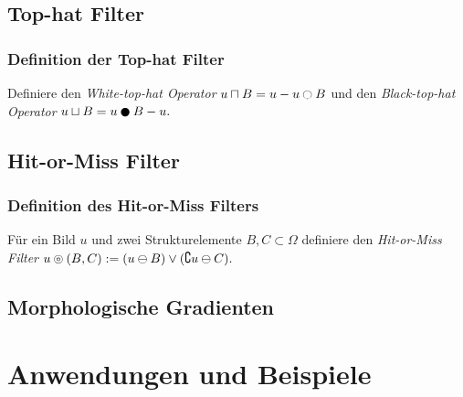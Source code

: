 \documentclass{beamer}
\begin{document}
\subsection{Top-hat Filter}

\begin{frame}
    \frametitle{Definition der Top-hat Filter}
    \begin{definition}
        Definiere den \emph{White-top-hat Operator}
        \begin{math}
            u \wtophat B = u - u \open B
        \end{math}
        und den \emph{Black-top-hat Operator}
        \begin{math}
            u \btophat B = u \close B - u.
        \end{math}
    \end{definition}
\end{frame}

\subsection{Hit-or-Miss Filter}

\begin{frame}
    \frametitle{Definition des Hit-or-Miss Filters}
    \begin{definition}
        Für ein Bild $u$ und zwei Strukturelemente $B, C \subset \Omega$ definiere den \emph{Hit-or-Miss Filter}
        \begin{math}
            u \circledcirc (B,C) := (u \ominus B) \vee (\complement u \ominus C).
        \end{math}
    \end{definition}
\end{frame}

\subsection{Morphologische Gradienten}

\begin{frame}
\end{frame}

\section{Anwendungen und Beispiele}

\begin{frame}
    
\end{frame}
\end{document}
